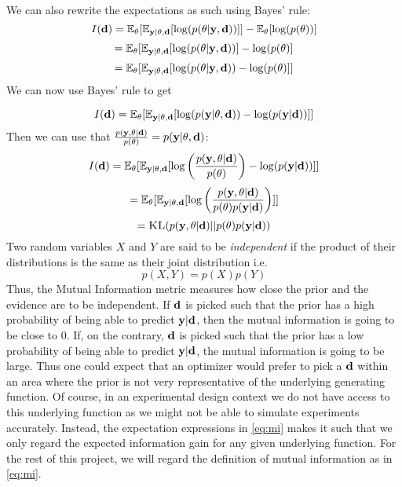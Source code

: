 We can also rewrite the expectations as such using Bayes' rule:
\begin{equation}\label{eq:mi}I(\mathbf{d})  = \mathbb{E}_{\mathbf{\theta}}[\mathbb{E}_{\mathbf{y}| \theta, \mathbf{d}} [\log(p(\theta | \mathbf{y}, \mathbf{d}))]] - \mathbb{E}_{\theta}[\log(p(\theta))]\end{equation}
\begin{equation}= \mathbb{E}_{\mathbf{\theta}}[\mathbb{E}_{\mathbf{y}| \theta, \mathbf{d}} [\log(p(\theta | \mathbf{y}, \mathbf{d}))] - \log(p(\theta)]\end{equation}
\begin{equation}= \mathbb{E}_{\mathbf{\theta}}[\mathbb{E}_{\mathbf{y}| \theta, \mathbf{d}} [\log(p(\theta | \mathbf{y}, \mathbf{d})) - \log(p(\theta)]]\end{equation}
We can now use Bayes' rule to get

\begin{equation} I(\mathbf{d})  = \mathbb{E}_{\mathbf{\theta}}[\mathbb{E}_{\mathbf{y} | \theta, \mathbf{d}} [\log(p(\mathbf{y} | \mathbf{\theta}, \mathbf{d})) - \log(p(\mathbf{y}|\mathbf{d}))]]\end{equation} 
Then we can use that $\frac{p(\mathbf{y}, \mathbf{\theta}|\mathbf{d})}{p(\theta)}=p(\mathbf{y| \theta, \mathbf{d}})$:
\begin{equation} I(\mathbf{d})  = \mathbb{E}_{\mathbf{\theta}}[\mathbb{E}_{\mathbf{y} | \theta, \mathbf{d}} [\log\left(\frac{p(\mathbf{y}, \mathbf{\theta}|\mathbf{d})}{p(\theta)}\right) - \log(p(\mathbf{y}|\mathbf{d}))]]\end{equation}
\begin{equation}= \mathbb{E}_{\mathbf{\theta}}[\mathbb{E}_{\mathbf{y} | \theta, \mathbf{d}} [\log\left(\frac{p(\mathbf{y}, \mathbf{\theta}|\mathbf{d})}{p(\theta)p(\mathbf{y}|\mathbf{d})}\right)]]\end{equation}
$$ = \textsc{KL}(p(\mathbf{y}, \theta | \mathbf{d})|| p(\theta)p(\mathbf{y}|\mathbf{d}))$$
Two random variables $X$ and $Y$ are said to be \textit{independent} if the product of their distributions is the same as their joint distribution i.e.
\begin{equation}p(X,Y) = p(X)p(Y)\end{equation}
Thus, the Mutual Information metric measures how close the prior and the evidence are to be independent. 
If $\mathbf{d}$ is picked such that the prior has a high probability of being able to predict $\mathbf{y}|\mathbf{d}$, then the mutual information is going to be close to 0. 
If, on the contrary, $\mathbf{d}$ is picked such that the prior has a low probability of being able to predict $\mathbf{y}|\mathbf{d}$, the mutual information is going to be large.
Thus one could expect that an optimizer would prefer to pick a $\mathbf{d}$ within an area where the prior is not very representative of the underlying generating function.
Of course, in an experimental design context we do not have access to this underlying function as we might not be able to simulate experiments accurately. Instead, the expectation expressions in \ref{eq:mi}
makes it such that we only regard the expected information gain for any given underlying function.
For the rest of this project, we will regard the definition of mutual information as in \eqref{eq:mi}.

